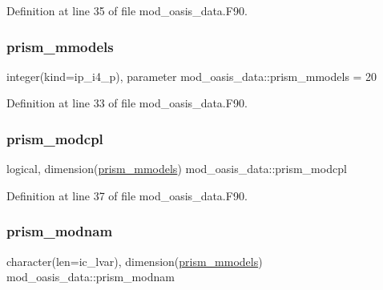 Definition at line 35 of file mod\+\_\+oasis\+\_\+data.\+F90.

\mbox{\label{namespacemod__oasis__data_a11c61975c048981f7e508f1b6caf16b6}} 
\subsubsection{\texorpdfstring{prism\+\_\+mmodels}{prism\_mmodels}}
{\footnotesize\ttfamily integer(kind=ip\+\_\+i4\+\_\+p), parameter mod\+\_\+oasis\+\_\+data\+::prism\+\_\+mmodels = 20}



Definition at line 33 of file mod\+\_\+oasis\+\_\+data.\+F90.

\mbox{\label{namespacemod__oasis__data_ad5282716e60cbe5e8c1ced7758fc9ae1}} 
\subsubsection{\texorpdfstring{prism\+\_\+modcpl}{prism\_modcpl}}
{\footnotesize\ttfamily logical, dimension(\hyperlink{namespacemod__oasis__data_a11c61975c048981f7e508f1b6caf16b6}{prism\+\_\+mmodels}) mod\+\_\+oasis\+\_\+data\+::prism\+\_\+modcpl}



Definition at line 37 of file mod\+\_\+oasis\+\_\+data.\+F90.

\mbox{\label{namespacemod__oasis__data_abd4b98e9f321bc073d5a8e0292ba7131}} 
\subsubsection{\texorpdfstring{prism\+\_\+modnam}{prism\_modnam}}
{\footnotesize\ttfamily character(len=ic\+\_\+lvar), dimension(\hyperlink{namespacemod__oasis__data_a11c61975c048981f7e508f1b6caf16b6}{prism\+\_\+mmodels}) mod\+\_\+oasis\+\_\+data\+::prism\+\_\+modnam}



